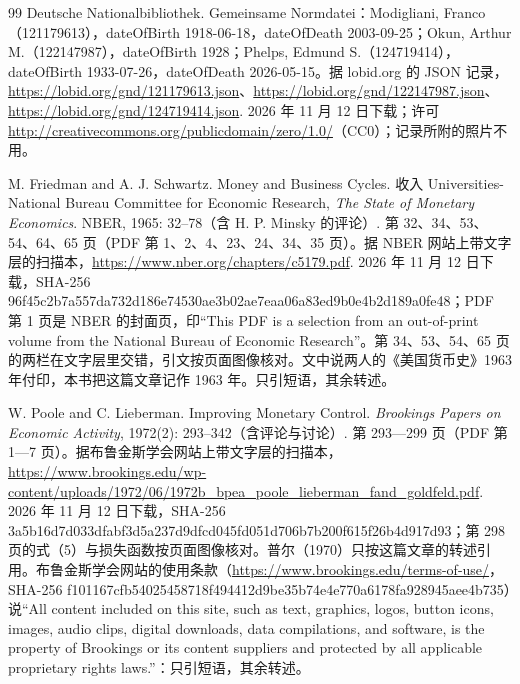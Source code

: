 \begin{thebibliography}{99}
 Deutsche Nationalbibliothek. Gemeinsame Normdatei：Modigliani, Franco（121179613），dateOfBirth 1918-06-18，dateOfDeath 2003-09-25；Okun, Arthur M.（122147987），dateOfBirth 1928；Phelps, Edmund S.（124719414），dateOfBirth 1933-07-26，dateOfDeath 2026-05-15。据 lobid.org 的 JSON 记录，\url{https://lobid.org/gnd/121179613.json}、\url{https://lobid.org/gnd/122147987.json}、\url{https://lobid.org/gnd/124719414.json}. 2026 年 11 月 12 日下载；许可 \url{http://creativecommons.org/publicdomain/zero/1.0/}（CC0）；记录所附的照片不用。

 M. Friedman and A. J. Schwartz. Money and Business Cycles. 收入 Universities-National Bureau Committee for Economic Research, \emph{The State of Monetary Economics}. NBER, 1965: 32--78（含 H. P. Minsky 的评论）. 第 32、34、53、54、64、65 页（PDF 第 1、2、4、23、24、34、35 页）。据 NBER 网站上带文字层的扫描本，\url{https://www.nber.org/chapters/c5179.pdf}. 2026 年 11 月 12 日下载，SHA-256 96f45c2b7a557da732d186e74530ae3b02ae7eaa06a83ed9b0e4b2d189a0fe48；PDF 第 1 页是 NBER 的封面页，印“This PDF is a selection from an out-of-print volume from the National Bureau of Economic Research”。第 34、53、54、65 页的两栏在文字层里交错，引文按页面图像核对。文中说两人的《美国货币史》1963 年付印，本书把这篇文章记作 1963 年。只引短语，其余转述。

 W. Poole and C. Lieberman. Improving Monetary Control. \emph{Brookings Papers on Economic Activity}, 1972(2): 293--342（含评论与讨论）. 第 293—299 页（PDF 第 1—7 页）。据布鲁金斯学会网站上带文字层的扫描本，\url{https://www.brookings.edu/wp-content/uploads/1972/06/1972b_bpea_poole_lieberman_fand_goldfeld.pdf}. 2026 年 11 月 12 日下载，SHA-256 3a5b16d7d033dfabf3d5a237d9dfcd045fd051d706b7b200f615f26b4d917d93；第 298 页的式（5）与损失函数按页面图像核对。普尔（1970）只按这篇文章的转述引用。布鲁金斯学会网站的使用条款（\url{https://www.brookings.edu/terms-of-use/}，SHA-256 f101167cfb54025458718f494412d9be35b74e4e770a6178fa928945aee4b735）说“All content included on this site, such as text, graphics, logos, button icons, images, audio clips, digital downloads, data compilations, and software, is the property of Brookings or its content suppliers and protected by all applicable proprietary rights laws.”：只引短语，其余转述。


\end{thebibliography}
